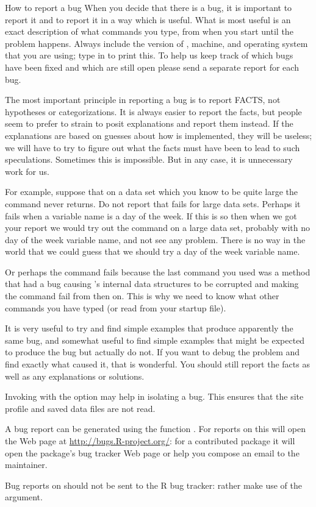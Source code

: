\begin{Section}{How to report a bug}
When you decide that there is a bug, it is important to report it and
to report it in a way which is useful.  What is most useful is an
exact description of what commands you type, from when you start \R{}
until the problem happens.  Always include the version of \R{}, machine,
and operating system that you are using; type  in \R{} to
print this.  To help us keep track of which bugs have been fixed and
which are still open please send a separate report for each bug.

The most important principle in reporting a bug is to report FACTS,
not hypotheses or categorizations.  It is always easier to report the
facts, but people seem to prefer to strain to posit explanations and
report them instead.  If the explanations are based on guesses about
how \R{} is implemented, they will be useless; we will have to try to
figure out what the facts must have been to lead to such
speculations.  Sometimes this is impossible.  But in any case, it is
unnecessary work for us.

For example, suppose that on a data set which you know to be quite
large the command  never
returns.  Do not report that  fails for large data
sets.  Perhaps it fails when a variable name is a day of the week.  If
this is so then when we got your report we would try out the
 command on a large data set, probably with no day
of the week variable name, and not see any problem. There is no way in
the world that we could guess that we should try a day of the week
variable name.

Or perhaps the command fails because the last command you used was a
\code{[} method that had a bug causing \R{}'s internal data structures
to be corrupted and making the  command fail from
then on.  This is why we need to know what other commands you have
typed (or read from your startup file).

It is very useful to try and find simple examples that produce
apparently the same bug, and somewhat useful to find simple examples
that might be expected to produce the bug but actually do not.  If you
want to debug the problem and find exactly what caused it, that is
wonderful.  You should still report the facts as well as any
explanations or solutions.

Invoking \R{} with the  option may help in isolating a
bug.  This ensures that the site profile and saved data files are not
read.

A bug report can be generated using the function .
For reports on \R{} this will open the Web page at
\url{http://bugs.R-project.org/}: for a contributed package it will
open the package's bug tracker Web page or help you compose an email
to the maintainer.

Bug reports on  should not be sent to the
R bug tracker: rather make use of the  argument.
\end{Section}
